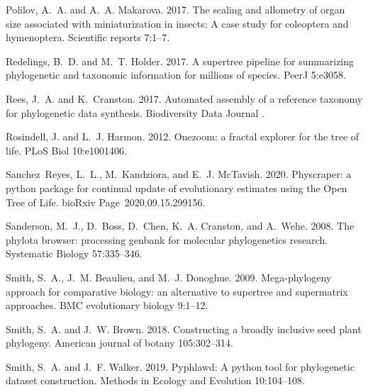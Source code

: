 \documentclass[oupdraft]{sysbio_sse}
\begin{document}
\begin{thebibliography}{49}
Polilov, A.~A. and A.~A. Makarova. 2017. The scaling and allometry of organ
  size associated with miniaturization in insects: A case study for coleoptera
  and hymenoptera. Scientific reports 7:1--7.

Redelings, B.~D. and M.~T. Holder. 2017. A supertree pipeline for summarizing
  phylogenetic and taxonomic information for millions of species. PeerJ
  5:e3058.

Rees, J.~A. and K.~Cranston. 2017. Automated assembly of a reference taxonomy
  for phylogenetic data synthesis. Biodiversity Data Journal .

Rosindell, J. and L.~J. Harmon. 2012. Onezoom: a fractal explorer for the tree
  of life. PLoS Biol 10:e1001406.

Sanchez~Reyes, L.~L., M.~Kandziora, and E.~J. McTavish. 2020. Physcraper: a
  python package for continual update of evolutionary estimates using the
  {Open} {Tree} of {Life}. bioRxiv Page~2020.09.15.299156.

Sanderson, M.~J., D.~Boss, D.~Chen, K.~A. Cranston, and A.~Wehe. 2008. The
  phylota browser: processing genbank for molecular phylogenetics research.
  Systematic Biology 57:335--346.

Smith, S.~A., J.~M. Beaulieu, and M.~J. Donoghue. 2009. Mega-phylogeny approach
  for comparative biology: an alternative to supertree and supermatrix
  approaches. BMC evolutionary biology 9:1--12.

Smith, S.~A. and J.~W. Brown. 2018. Constructing a broadly inclusive seed plant
  phylogeny. American journal of botany 105:302--314.

Smith, S.~A. and J.~F. Walker. 2019. Pyphlawd: A python tool for phylogenetic
  dataset construction. Methods in Ecology and Evolution 10:104--108.


\end{thebibliography}
\end{document}
